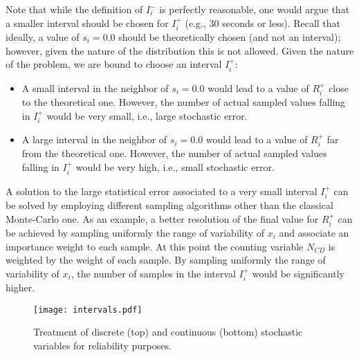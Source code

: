 Note that while the definition of $I_i^-$ is perfectly reasonable, one would argue that a smaller interval 
should be chosen for $I_i^+$ (e.g., 30 seconds or less). 
Recall that ideally, a value of $s_i=0.0$ should be theoretically chosen (and not an interval); however, 
given the nature of the distribution this is not allowed. Given the nature of the problem, we are bound 
to choose an interval $I_i^+$:
\begin{itemize}
  \item A small interval in the neighbor of $s_i=0.0$ would lead to a value of $R_i^+$ close to the theoretical 
        one. 
        However, the number of actual sampled values falling in $I_i^+$ would be very small, i.e., large stochastic 
        error.
  \item A large interval in the neighbor of $s_i=0.0$ would lead to a value of $R_i^+$ far from the theoretical one. 
        However, the number of actual sampled values falling in $I_i^+$ would be very high,
        i.e., small stochastic error.
\end{itemize}

A solution to the large statistical error associated to a very small interval $I_i^+$ can be solved by 
employing different sampling algorithms other than the classical Monte-Carlo one. 
As an example, a better resolution of the final value for $R_i^+$ can be achieved by sampling uniformly 
the range of variability of $x_i$ and associate an importance weight to each sample. At this point
the counting variable $N_{CD}$ is weighted by the weight of each sample. By sampling uniformly the range of 
variability of $x_i$, the number of samples in the interval $I_i^+$ would be significantly higher.

\begin{figure}
    \centering
    \centerline{\texttt{[image: intervals.pdf]}} 
    \caption{Treatment of discrete (top) and continuous (bottom) stochastic variables for reliability purposes.}
    \label{fig:intervals}
\end{figure}
